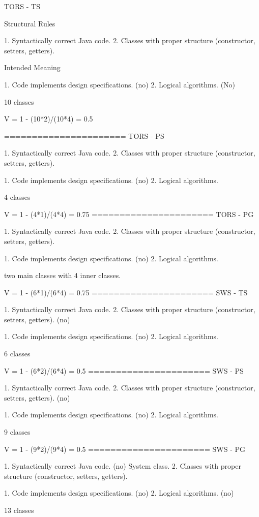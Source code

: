 TORS - TS

Structural Rules

1. Syntactically correct Java code. 
2. Classes with proper structure (constructor, setters, getters). 

Intended Meaning 

1. Code implements design specifications. (no)
2. Logical algorithms. (No)

10 classes 

V = 1 - (10*2)/(10*4) = 0.5

======================
TORS - PS

1. Syntactically correct Java code. 
2. Classes with proper structure (constructor, setters, getters). 

1. Code implements design specifications. (no)
2. Logical algorithms. 

4 classes

V = 1 - (4*1)/(4*4) = 0.75
======================
TORS - PG

1. Syntactically correct Java code. 
2. Classes with proper structure (constructor, setters, getters). 

1. Code implements design specifications. (no)
2. Logical algorithms. 

two main classes with 4 inner classes. 

V = 1 - (6*1)/(6*4) = 0.75
======================
SWS - TS

1. Syntactically correct Java code. 
2. Classes with proper structure (constructor, setters, getters). (no)

1. Code implements design specifications. (no)
2. Logical algorithms. 

6 classes

V = 1 - (6*2)/(6*4) = 0.5
======================
SWS - PS

1. Syntactically correct Java code. 
2. Classes with proper structure (constructor, setters, getters). (no)

1. Code implements design specifications. (no)
2. Logical algorithms. 

9 classes

V = 1 - (9*2)/(9*4) = 0.5
======================
SWS - PG

1. Syntactically correct Java code. (no) System class. 
2. Classes with proper structure (constructor, setters, getters). 

1. Code implements design specifications. (no)
2. Logical algorithms. (no)

13 classes

